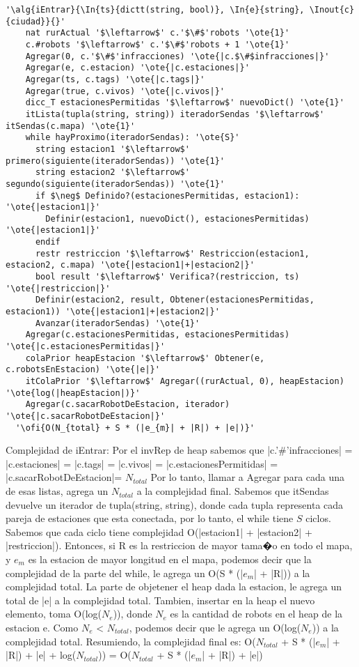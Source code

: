   \begin{lstlisting}[mathescape]
  '\alg{iEntrar}{\In{ts}{dictt(string, bool)}, \In{e}{string}, \Inout{c}{ciudad}}{}'
    nat rurActual '$\leftarrow$' c.'$\#$'robots '\ote{1}'
    c.#robots '$\leftarrow$' c.'$\#$'robots + 1 '\ote{1}'
    Agregar(0, c.'$\#$'infracciones) '\ote{|c.$\#$infracciones|}'
    Agregar(e, c.estacion) '\ote{|c.estaciones|}'
    Agregar(ts, c.tags) '\ote{|c.tags|}'
    Agregar(true, c.vivos) '\ote{|c.vivos|}'
    dicc_T estacionesPermitidas '$\leftarrow$' nuevoDict() '\ote{1}'
    itLista(tupla(string, string)) iteradorSendas '$\leftarrow$' itSendas(c.mapa) '\ote{1}'
    while hayProximo(iteradorSendas): '\ote{S}'
      string estacion1 '$\leftarrow$' primero(siguiente(iteradorSendas)) '\ote{1}'
      string estacion2 '$\leftarrow$' segundo(siguiente(iteradorSendas)) '\ote{1}'
      if $\neg$ Definido?(estacionesPermitidas, estacion1): '\ote{|estacion1|}'
        Definir(estacion1, nuevoDict(), estacionesPermitidas) '\ote{|estacion1|}'
      endif  
      restr restriccion '$\leftarrow$' Restriccion(estacion1, estacion2, c.mapa) '\ote{|estacion1|+|estacion2|}'
      bool result '$\leftarrow$' Verifica?(restriccion, ts) '\ote{|restriccion|}'
      Definir(estacion2, result, Obtener(estacionesPermitidas, estacion1)) '\ote{|estacion1|+|estacion2|}'
      Avanzar(iteradorSendas) '\ote{1}'
    Agregar(c.estacionesPermitidas, estacionesPermitidas) '\ote{|c.estacionesPermitidas|}'
    colaPrior heapEstacion '$\leftarrow$' Obtener(e, c.robotsEnEstacion) '\ote{|e|}'
    itColaPrior '$\leftarrow$' Agregar((rurActual, 0), heapEstacion) '\ote{log(|heapEstacion|)}'
    Agregar(c.sacarRobotDeEstacion, iterador) '\ote{|c.sacarRobotDeEstacion|}'
  '\ofi{O(N_{total} + S * (|e_{m}| + |R|) + |e|)}'
  \end{lstlisting}

	Complejidad de iEntrar:
	Por el invRep de heap sabemos que
	|c.'$\#$'infracciones| = |c.estaciones| = |c.tags| = |c.vivos| = |c.estacionesPermitidas|  = |c.sacarRobotDeEstacion|= $N_{total}$
	Por lo tanto, llamar a Agregar para cada una de esas listas, agrega un $N_{total}$ a la complejidad final.
	Sabemos que itSendas devuelve un iterador de tupla(string, string), donde cada tupla representa cada pareja de estaciones que esta conectada, 
	por lo tanto, el while tiene $S$ ciclos. Sabemos que cada ciclo tiene complejidad O(|estacion1| + |estacion2| + |restriccion|).
	Entonces, si R es la restriccion de mayor tama�o en todo el mapa, y $e_{m}$ es la estacion de mayor longitud en el mapa, podemos decir que la
	complejidad de la parte del while, le agrega un O(S * (|$e_{m}$| + |R|)) a la complejidad total.
	La parte de objetener el heap dada la estacion, le agrega un total de |e| a la complejidad total.
	Tambien, insertar en la heap el nuevo elemento, toma O(log($N_{e}$)), donde $N_{e}$ es la cantidad de robots en el heap de la estacion e. 
	Como $N_{e}$ < $N_{total}$, podemos decir que le agrega un O(log($N_{e}$)) a la complejidad total.
	Resumiendo, la complejidad final es:
		O($N_{total}$ + S * (|$e_{m}$| + |R|) + |e| + log($N_{total}$)) = O($N_{total}$ + S * (|$e_{m}$| + |R|) + |e|)
	


